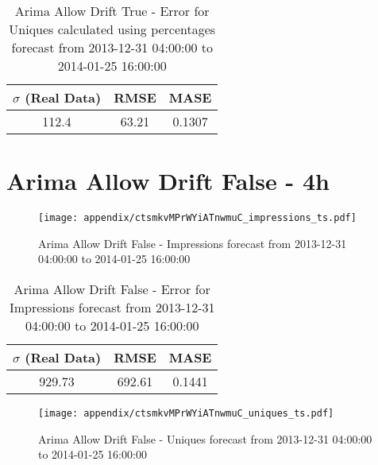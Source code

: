 \begin{table}[H]
\centering
\footnotesize
\begin{tabular}{ccc}
$\sigma$ (Real Data) & RMSE & MASE   \\ \hline
112.4 & 63.21 & 0.1307 \\
\end{tabular}

\vspace{0.5cm}

\caption{
Arima Allow Drift True - Error for Uniques calculated using percentages forecast from 2013-12-31 04:00:00 to 2014-01-25 16:00:00}
\end{table}

\section{Arima Allow Drift False - 4h}
\begin{figure}[H] \begin{center} \leavevmode
\texttt{[image: appendix/ctsmkvMPrWYiATnwmuC\_impressions\_ts.pdf]} \caption{
Arima Allow Drift False - Impressions forecast from 2013-12-31 04:00:00 to 2014-01-25 16:00:00} \label{fig:appendix/ctsmkvMPrWYiATnwmuC_impressions_ts.pdf} \end{center}
\end{figure}

\begin{table}[H]
\centering
\footnotesize
\begin{tabular}{ccc}
$\sigma$ (Real Data) & RMSE & MASE   \\ \hline
929.73 & 692.61 & 0.1441 \\
\end{tabular}

\vspace{0.5cm}

\caption{
Arima Allow Drift False - Error for Impressions forecast from 2013-12-31 04:00:00 to 2014-01-25 16:00:00}
\end{table}

\begin{figure}[H] \begin{center} \leavevmode
\texttt{[image: appendix/ctsmkvMPrWYiATnwmuC\_uniques\_ts.pdf]} \caption{
Arima Allow Drift False - Uniques forecast from 2013-12-31 04:00:00 to 2014-01-25 16:00:00} \label{fig:appendix/ctsmkvMPrWYiATnwmuC_uniques_ts.pdf} \end{center}
\end{figure}

